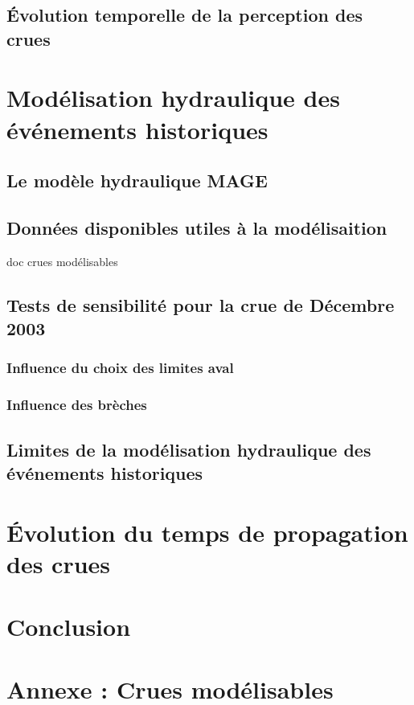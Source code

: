 \documentclass[11pt]{article}
\begin{document}
	\subsection{Évolution temporelle de la perception des crues}

\section{Modélisation hydraulique des événements historiques}

	\subsection{Le modèle hydraulique MAGE}
	
	\subsection{Données disponibles utiles à la modélisaition}
	doc crues modélisables
	
	\subsection{Tests de sensibilité pour la crue de Décembre 2003}
		\subsubsection{Influence du choix des limites aval}
		
		\subsubsection{Influence des brèches}
	
	\subsection{Limites de la modélisation hydraulique des événements historiques}

\section{Évolution du temps de propagation des crues}

\section{Conclusion}

\section{Annexe : Crues modélisables}



\printbibliography
\end{document}
